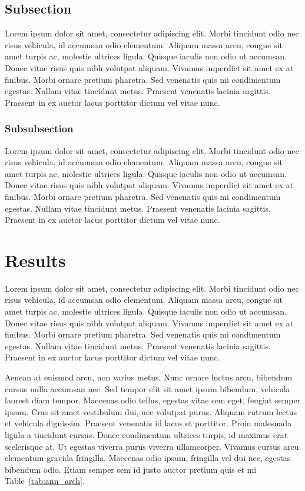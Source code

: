 \documentclass[twocolumn]{miniclass}
\begin{document}
\subsection{Subsection}
Lorem ipsum dolor sit amet, consectetur adipiscing elit. Morbi tincidunt odio nec risus vehicula, id accumsan odio elementum. Aliquam massa arcu, congue sit amet turpis ac, molestie ultrices ligula. Quisque iaculis non odio ut accumsan. Donec vitae risus quis nibh volutpat aliquam. Vivamus imperdiet sit amet ex at finibus. Morbi ornare pretium pharetra. Sed venenatis quis mi condimentum egestas. Nullam vitae tincidunt metus. Praesent venenatis lacinia sagittis. Praesent in ex auctor lacus porttitor dictum vel vitae nunc.

\subsubsection{Subsubsection}
Lorem ipsum dolor sit amet, consectetur adipiscing elit. Morbi tincidunt odio nec risus vehicula, id accumsan odio elementum. Aliquam massa arcu, congue sit amet turpis ac, molestie ultrices ligula. Quisque iaculis non odio ut accumsan. Donec vitae risus quis nibh volutpat aliquam. Vivamus imperdiet sit amet ex at finibus. Morbi ornare pretium pharetra. Sed venenatis quis mi condimentum egestas. Nullam vitae tincidunt metus. Praesent venenatis lacinia sagittis. Praesent in ex auctor lacus porttitor dictum vel vitae nunc.

\section{Results}
Lorem ipsum dolor sit amet, consectetur adipiscing elit. Morbi tincidunt odio nec risus vehicula, id accumsan odio elementum. Aliquam massa arcu, congue sit amet turpis ac, molestie ultrices ligula. Quisque iaculis non odio ut accumsan. Donec vitae risus quis nibh volutpat aliquam. Vivamus imperdiet sit amet ex at finibus. Morbi ornare pretium pharetra. Sed venenatis quis mi condimentum egestas. Nullam vitae tincidunt metus. Praesent venenatis lacinia sagittis. Praesent in ex auctor lacus porttitor dictum vel vitae nunc.

Aenean at euismod arcu, non varius metus. Nunc ornare luctus arcu, bibendum cursus nulla accumsan nec. Sed tempor elit sit amet ipsum bibendum, vehicula laoreet diam tempor. Maecenas odio tellus, egestas vitae sem eget, feugiat semper ipsum. Cras sit amet vestibulum dui, nec volutpat purus. Aliquam rutrum lectus et vehicula dignissim. Praesent venenatis id lacus et porttitor. Proin malesuada ligula a tincidunt cursus. Donec condimentum ultrices turpis, id maximus erat scelerisque at. Ut egestas viverra purus viverra ullamcorper. Vivamus cursus arcu elementum gravida fringilla. Maecenas odio ipsum, fringilla vel dui nec, egestas bibendum odio. Etiam semper sem id justo auctor pretium quis et mi Table~\ref{tab:ann_arch}.
\end{document}

